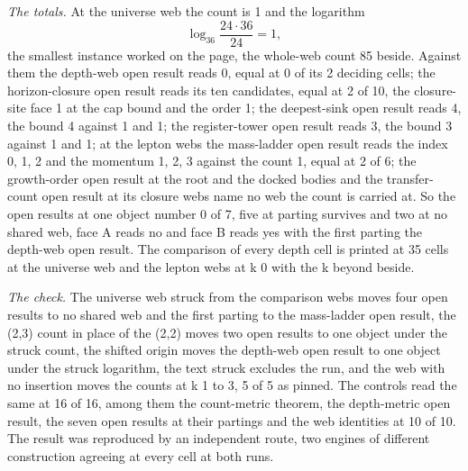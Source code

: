 \begin{chproof}
\textit{The totals.} At the universe web the count is 1 and the logarithm
\begin{equation}
\log_{36}\frac{24\cdot 36}{24} = 1,
\end{equation}
the smallest instance worked on the page, the whole-web count 85 beside. Against them the depth-web open result reads 0, equal at 0 of its 2 deciding cells; the horizon-closure open result reads its ten candidates, equal at 2 of 10, the closure-site face 1 at the cap bound and the order 1; the deepest-sink open result reads 4, the bound 4 against 1 and 1; the register-tower open result reads 3, the bound 3 against 1 and 1; at the lepton webs the mass-ladder open result reads the index 0, 1, 2 and the momentum 1, 2, 3 against the count 1, equal at 2 of 6; the growth-order open result at the root and the docked bodies and the transfer-count open result at its closure webs name no web the count is carried at. So the open results at one object number 0 of 7, five at parting survives and two at no shared web, face A reads no and face B reads yes with the first parting the depth-web open result. The comparison of every depth cell is printed at 35 cells at the universe web and the lepton webs at k 0 with the k beyond beside.

\textit{The check.} The universe web struck from the comparison webs moves four open results to no shared web and the first parting to the mass-ladder open result, the (2,3) count in place of the (2,2) moves two open results to one object under the struck count, the shifted origin moves the depth-web open result to one object under the struck logarithm, the text struck excludes the run, and the web with no insertion moves the counts at k 1 to 3, 5 of 5 as pinned. The controls read the same at 16 of 16, among them the count-metric theorem, the depth-metric open result, the seven open results at their partings and the web identities at 10 of 10. The result was reproduced by an independent route, two engines of different construction agreeing at every cell at both runs.
\end{chproof}
